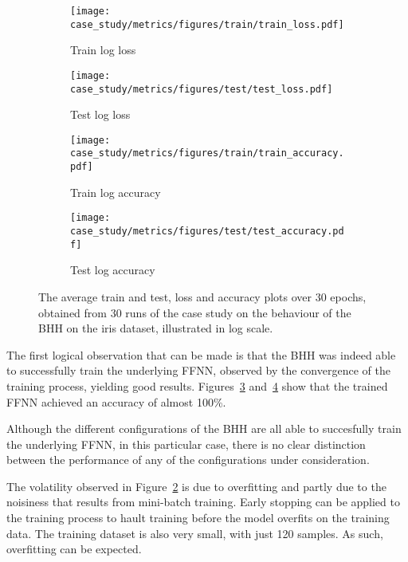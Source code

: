 \begin{figure}[htb]
	\begin{subfigure}{0.5\textwidth}
		\centering
		\texttt{[image: case\_study/metrics/figures/train/train\_loss.pdf]}
		\caption{Train log loss}
		\label{fig:results:case_study:metrics:train_loss}
	\end{subfigure}
	\begin{subfigure}{0.5\textwidth}
		\centering
		\texttt{[image: case\_study/metrics/figures/test/test\_loss.pdf]}
		\caption{Test log loss}
		\label{fig:results:case_study:metrics:test_loss}
	\end{subfigure}
	\par\bigskip
	\begin{subfigure}{0.5\textwidth}
		\centering
		\texttt{[image: case\_study/metrics/figures/train/train\_accuracy.pdf]}
		\caption{Train log accuracy}
		\label{fig:results:case_study:metrics:train_accuracy}
	\end{subfigure}
	\begin{subfigure}{0.5\textwidth}
		\centering
		\texttt{[image: case\_study/metrics/figures/test/test\_accuracy.pdf]}
		\caption{Test log accuracy}
		\label{fig:results:case_study:metrics:test_accuracy}
	\end{subfigure}
	\par\bigskip
	\caption{The average train and test, loss and accuracy plots over 30 epochs, obtained from 30 runs of the case study on the behaviour of the \acs{BHH} on the iris dataset, illustrated in log scale.}
	\label{fig:results:case_study:metrics}
\end{figure}

The first logical observation that can be made is that the \acs{BHH} was indeed able to successfully train the underlying \acs{FFNN}, observed by the convergence of the training process, yielding good results. Figures~\ref{fig:results:case_study:metrics:train_accuracy} and~\ref{fig:results:case_study:metrics:test_accuracy} show that the trained \acs{FFNN} achieved an accuracy of almost 100\%.

Although the different configurations of the \acs{BHH} are all able to succesfully train the underlying \acs{FFNN}, in this particular case, there is no clear distinction between the performance of any of the configurations under consideration.

The volatility observed in Figure~\ref{fig:results:case_study:metrics:test_loss} is due to overfitting and partly due to the noisiness that results from mini-batch training. Early stopping can be applied to the training process to hault training before the model overfits on the training data. The training dataset is also very small, with just 120 samples. As such, overfitting can be expected.

